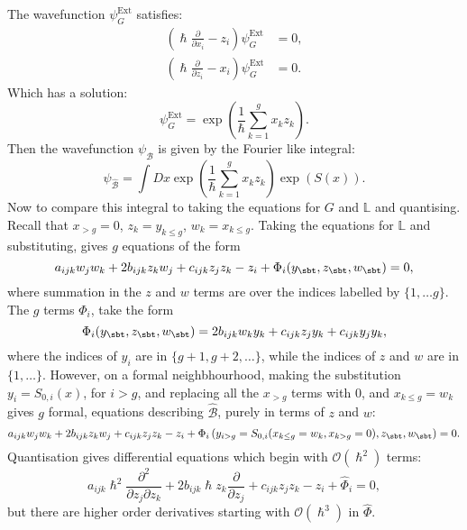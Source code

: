     The wavefunction \( \psi_G^{\text{Ext}}\) satisfies:
    \begin{align*}
        \left( \hslash \frac{\partial}{\partial x_i } -z_i \right)\psi_G^{\text{Ext}} &= 0,\\
        \left( \hslash \frac{\partial}{\partial z_i } - x_i \right)  \psi_G^{\text{Ext}} &= 0.
    \end{align*}
    Which has a solution:
    \begin{equation} 
    \label{eqn:psigextgdim}
    \psi_G^{\text{Ext}} = \exp\left(\frac{1}{\hslash} \sum_{k=1}^g x_k z_k \right).
    \end{equation}
    Then the wavefunction \(\psi_{\widehat{\mathcal{B}}}\) is given by the Fourier like integral:
    \[ \psi_{\widehat{\mathcal{B}}} = \int Dx  \exp\left(\frac{1}{\hslash} \sum_{k=1}^g x_k z_k \right) \exp(S(x)). \]
    Now to compare this integral to taking the equations for \(G\) and \( \mathbb{L}\) and quantising. Recall that \( x_{>g} = 0\), \( z_k = y_{k\leq g } \), \( w_k = x_{k\leq g} \). Taking the equations for \( \mathbb{L}\) and substituting, gives \(g\) equations of the form
    \[ a_{ijk}w_j w_k + 2 b_{ijk}z_k w_j + c_{ijk}z_j z_k - z_i   +  \Phi_i(y_{\sbt},z_{\sbt},w_{\sbt})   =0, \]
    where summation in the \(z\) and \(w\) terms are over the indices labelled by \( \{1,\dots g\}\). The \(g\) terms \( \Phi_i\), take the form
    \[\Phi_i(y_{\sbt},z_{\sbt},w_{\sbt}) = 2 b_{ijk}w_k y_k  + c_{ijk} z_j y_k + c_{ijk} y_j y_k ,\]
    where the indices of \(y_{i}\) are in \(\{g+1,g+2,\dots \}\), while the indices of \(z\) and \(w\) are in \( \{1,\dots \}\). 
    However, on a formal neighbhourhood, making the substitution \(y_i =  S_{0,i}(x)\), for \(i >g\), and replacing all the \(x_{>g}\) terms with \(0\), and \( x_{k \leq g} = w_{k}\) gives \(g\) formal, equations describing \( \widehat{\mathcal{B}}\), purely in terms of \(z\) and \(w\):
    \begin{equation} a_{ijk}w_j w_k + 2 b_{ijk}z_k w_j + c_{ijk}z_j z_k - z_i   +  \Phi_i\left(y_{i>g}=S_{0,i}(x_{k\leq g}=w_{k},x_{k>g} =0),z_{\sbt},w_{\sbt}\right) =0. 
    \end{equation}
    Quantisation gives differential equations which begin with \( \mathcal{O}(\hslash^2)\) terms:
    \[ a_{ijk}\hslash^2 \frac{\partial^2}{\partial z_j \partial z_k} + 2 b_{ijk} \hslash z_k \frac{\partial}{\partial z_j} + c_{ijk}z_j z_k - z_i + \widehat{\Phi}_i =0,  \]
    but there are higher order derivatives starting with \( \mathcal{O}(\hslash^3)\) in \( \widehat{\Phi}\).
    
